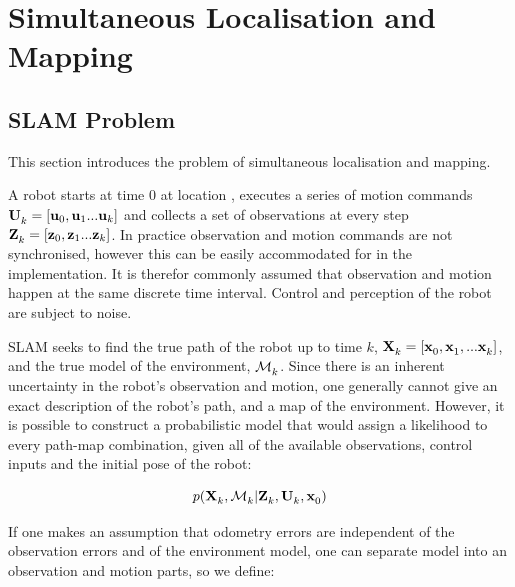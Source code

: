 \section{Simultaneous Localisation and Mapping}
\label{sec:SLAM}

\subsection{SLAM Problem}

This section introduces the problem of simultaneous localisation and
mapping.

A robot starts at time 0 at location , executes a series of
motion commands ${\bf U}^{}_{k} = [{\bf u}_{0},{\bf u}_{1}...{\bf u}_{k}]$ and collects a
set of observations at every step
${\bf Z}^{}_{k}=[{\bf z}_{0},{\bf z}_{1}...{\bf z}_{k}]$. In practice observation and motion
commands are not synchronised, however this can be easily accommodated
for in the implementation. It is therefor commonly assumed that
observation and motion happen at the same discrete time interval.
Control and perception of the robot are subject to noise.


SLAM seeks to find the true path of the robot up to time $k$,
$\Xall{k}{}{} = [\x{0}{}{}, \x{1}{}{}, ... \x{k}{}{}]$, and the true
model of the environment, $\map{k}{}{}$. Since there is an inherent
uncertainty in the robot's observation and motion, one generally
cannot give an exact description of the robot's path, and a map of the
environment. However, it is possible to construct a probabilistic
model that would assign a likelihood to every path-map combination,
given all of the available observations, control inputs and the
initial pose of the robot:

\begin{equation}
 p(\Xall{k}{}{}, \map{k}{}{} | \Zall{k}{}, \Uall{k}{}, \x{0}{}{})
\label{eqn:map}
\end{equation}

If one makes an assumption that odometry errors are independent of the
observation errors and of the environment model, one can separate
model into an observation and motion parts, so we define:

